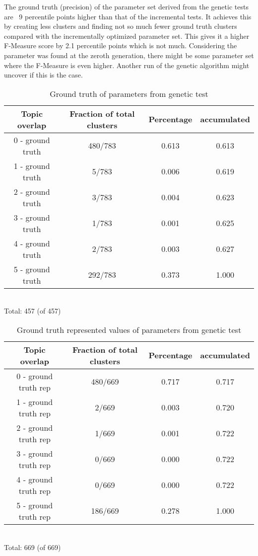 The ground truth (precision) of the parameter set derived from the genetic tests are ~9 percentile points higher than that of the incremental tests. It achieves this by creating less clusters and finding not so much fewer ground truth clusters compared with the incrementally optimized parameter set. This gives it a higher F-Measure score by 2.1 percentile points which is not much. Considering the parameter was found at the zeroth generation, there might be some parameter set where the F-Measure is even higher. Another run of the genetic algorithm might uncover if this is the case.


\begin{table}
\begin{center}
\begin{tabular}{|c|c|c|c|}
\hline
Topic overlap &  Fraction of total clusters & Percentage  & accumulated\\ 
\hline
0 - ground truth & 480/783 & 0.613 & 0.613\\
1 - ground truth &   5/783 & 0.006 & 0.619\\
2 - ground truth &   3/783 & 0.004 & 0.623\\
3 - ground truth &   1/783 & 0.001 & 0.625\\
4 - ground truth &   2/783 & 0.003 & 0.627\\
5 - ground truth & 292/783 & 0.373 & 1.000\\
\hline
\end{tabular}
\\Total: 457 (of  457)
\end{center}
\caption{Ground truth of parameters from genetic test}
\label{tab:geneticparametersgroundtruth}
\end{table}


\begin{table}
\begin{center}
\begin{tabular}{|c|c|c|c|}
\hline
Topic overlap &  Fraction of total clusters & Percentage  & accumulated\\ 
\hline
0 - ground truth rep & 480/669 & 0.717 & 0.717\\
1 - ground truth rep &   2/669 & 0.003 & 0.720\\
2 - ground truth rep &   1/669 & 0.001 & 0.722\\
3 - ground truth rep &   0/669 & 0.000 & 0.722\\
4 - ground truth rep &   0/669 & 0.000 & 0.722\\
5 - ground truth rep & 186/669 & 0.278 & 1.000\\
\hline
\end{tabular}
\\Total: 669 (of  669)
\end{center}
\caption{Ground truth represented values of parameters from genetic test}
\label{tab:geneticparametersgroundtruthrep}
\end{table}

